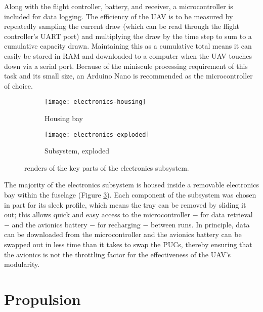 \documentclass[../../main.tex]{subfiles}
\begin{document}
Along with the flight controller, battery, and receiver, a microcontroller is included for data logging.
The efficiency of the UAV is to be measured by repeatedly sampling the current draw (which can be read through the flight controller's UART port) and multiplying the draw by the time step to sum to a cumulative capacity drawn.
Maintaining this as a cumulative total means it can easily be stored in RAM and downloaded to a computer when the UAV touches down via a serial port.
Because of the miniscule processing requirement of this task and its small size, an Arduino Nano is recommended as the microcontroller of choice.

\begin{figure}[H]
    \centering
    \begin{subfigure}[b]{0.49\columnwidth}
        \centering
        \texttt{[image: electronics-housing]}
        \caption{Housing bay}
        \label{fig:electronics-subsystem:bay}
    \end{subfigure}
    \hfill
    \begin{subfigure}[b]{0.49\columnwidth}
        \centering
        \texttt{[image: electronics-exploded]}
        \caption{Subsystem, exploded}
        \label{fig:electronics-subsystem:exploded}
    \end{subfigure}
    
    \caption{renders of the key parts of the electronics subsystem.}
    \label{fig:electronics-subsystem}
\end{figure} 

The majority of the electronics subsystem is housed inside a removable electronics bay within the fuselage (Figure \ref{fig:electronics-subsystem}).
Each component of the subsystem was chosen in part for its sleek profile, which means the tray can be removed by sliding it out; this allows quick and easy access to the microcontroller $-$ for data retrieval $-$ and the avionics battery $-$ for recharging $-$ between runs.
In principle, data can be downloaded from the microcontroller and the avionics battery can be swapped out in less time than it takes to swap the PUCs, thereby ensuring that the avionics is not the throttling factor for the effectiveness of the UAV's modularity.

\section{Propulsion} \label{sec:final-design-proposal:propulsion}
\end{document}
